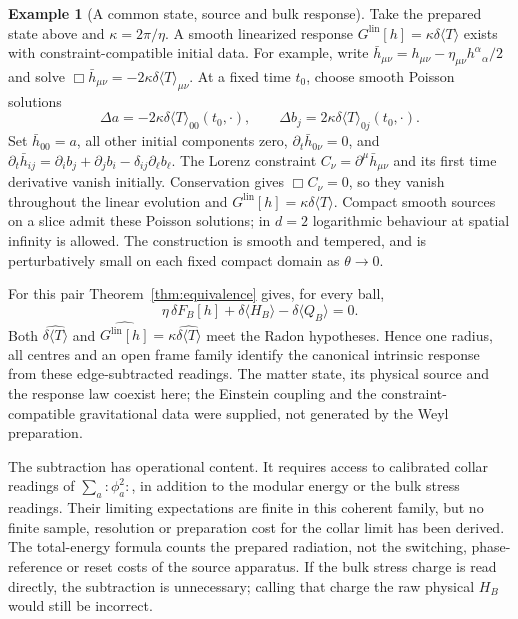 \documentclass[12pt]{article}
\theoremstyle{definition}
\newtheorem{example}[theorem]{Example}
\theoremstyle{remark}
\newcommand{\Glin}{G^{\mathrm{lin}}}
\newcommand{\dT}{\delta\langle T\rangle}
\newcommand{\ev}[1]{\langle #1\rangle}
\begin{document}
\begin{example}[A common state, source and bulk response]\label{ex:coherent}
Take the prepared state above and \(\kappa=2\pi/\eta\). A smooth linearized response
\(\Glin[h]=\kappa\dT\) exists with constraint-compatible initial data. For example,
write \(\bar h_{\mu\nu}=h_{\mu\nu}-\eta_{\mu\nu}h^\alpha{}_\alpha/2\) and solve
\(\Box\bar h_{\mu\nu}=-2\kappa\dT_{\mu\nu}\).
At a fixed time \(t_0\), choose smooth Poisson solutions
\[
\Delta a=-2\kappa\dT_{00}(t_0,\cdot),\qquad
\Delta b_j=2\kappa\dT_{0j}(t_0,\cdot).
\]
Set \(\bar h_{00}=a\), all other initial components zero,
\(\partial_t\bar h_{0\nu}=0\), and
\(\partial_t\bar h_{ij}=\partial_i b_j+\partial_j b_i-\delta_{ij}\partial_\ell b_\ell\).
The Lorenz constraint \(C_\nu=\partial^\mu\bar h_{\mu\nu}\) and its first time derivative
vanish initially. Conservation gives \(\Box C_\nu=0\), so they vanish throughout the
linear evolution and \(\Glin[h]=\kappa\dT\).
Compact smooth sources on a slice admit these Poisson solutions; in \(d=2\) logarithmic
behaviour at spatial infinity is allowed. The construction is smooth and tempered, and
is perturbatively small on each fixed compact domain as \(\theta\to0\).

For this pair Theorem~\ref{thm:equivalence} gives, for every ball,
\begin{equation}\label{eq:edgeMC}
\eta\,\delta F_B[h]
+\delta\ev{H_B}-\delta\ev{Q_B}=0.
\end{equation}
Both \(\widehat{\dT}\) and \(\widehat{\Glin[h]}=\kappa\widehat{\dT}\) meet the Radon
hypotheses. Hence one radius, all centres and an open frame family identify the
canonical intrinsic response from these edge-subtracted readings.
The matter state, its physical source and the response law coexist here; the Einstein
coupling and the constraint-compatible gravitational data were supplied, not generated
by the Weyl preparation.
\end{example}

The subtraction has operational content. It requires access to calibrated collar
readings of \(\sum_a:\!\phi_a^2\!:\), in addition to the modular energy or the bulk stress
readings. Their limiting expectations are finite in this coherent family, but no finite
sample, resolution or preparation cost for the collar limit has been derived.
The total-energy formula counts the prepared radiation, not the switching,
phase-reference or reset costs of the source apparatus.
If the bulk stress charge is read directly, the subtraction is unnecessary; calling that
charge the raw physical \(H_B\) would still be incorrect.
\end{document}
